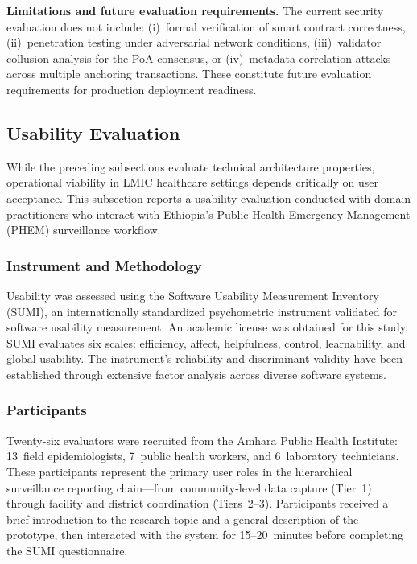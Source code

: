 \documentclass[AMA,LATO1COL]{WileyNJD-v2}
\begin{document}
\textbf{Limitations and future evaluation requirements.} The current security evaluation does not include: (i)~formal verification of smart contract correctness, (ii)~penetration testing under adversarial network conditions, (iii)~validator collusion analysis for the PoA consensus, or (iv)~metadata correlation attacks across multiple anchoring transactions. These constitute future evaluation requirements for production deployment readiness.

\subsection{Usability Evaluation}\label{subsec:usability}

While the preceding subsections evaluate technical architecture properties, operational viability in LMIC healthcare settings depends critically on user acceptance. This subsection reports a usability evaluation conducted with domain practitioners who interact with Ethiopia's Public Health Emergency Management (PHEM) surveillance workflow.

\subsubsection{Instrument and Methodology}

Usability was assessed using the Software Usability Measurement Inventory (SUMI), an internationally standardized psychometric instrument validated for software usability measurement. An academic license was obtained for this study. SUMI evaluates six scales: efficiency, affect, helpfulness, control, learnability, and global usability. The instrument's reliability and discriminant validity have been established through extensive factor analysis across diverse software systems.\cite{bevan1995measuring}

\subsubsection{Participants}

Twenty-six evaluators were recruited from the Amhara Public Health Institute: 13~field epidemiologists, 7~public health workers, and 6~laboratory technicians. These participants represent the primary user roles in the hierarchical surveillance reporting chain---from community-level data capture (Tier~1) through facility and district coordination (Tiers~2--3). Participants received a brief introduction to the research topic and a general description of the prototype, then interacted with the system for 15--20~minutes before completing the SUMI questionnaire.
\end{document}
